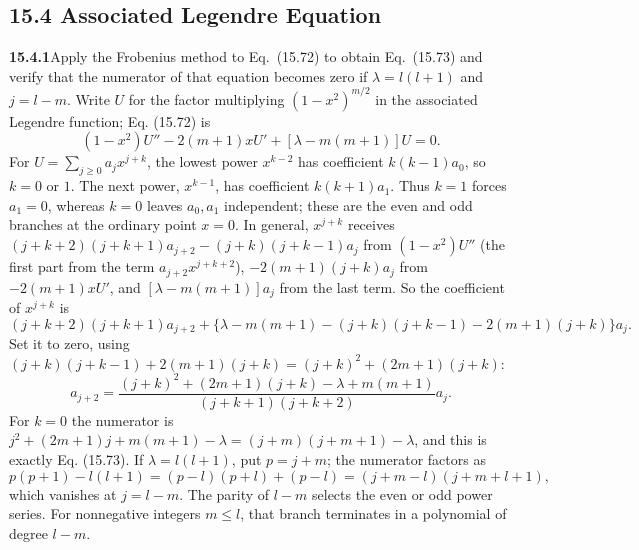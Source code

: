 \subsection*{15.4 Associated Legendre Equation}

\par\bigskip
\noindent\textbf{15.4.1}\quad Apply the Frobenius method to
Eq.~(15.72) to obtain Eq.~(15.73) and verify that the numerator of
that equation becomes zero if $\lambda=l(l+1)$ and $j=l-m$.
\solution
Write $U$ for the factor multiplying $(1-x^2)^{m/2}$ in the associated
Legendre function; Eq. (15.72) is
\[
(1-x^2)U''-2(m+1)xU'+[\lambda-m(m+1)]U=0.
\]
For $U=\sum_{j\ge0}a_jx^{j+k}$, the lowest power $x^{k-2}$
has coefficient $k(k-1)a_0$, so $k=0$ or $1$.
The next power, $x^{k-1}$, has coefficient $k(k+1)a_1$.
Thus $k=1$ forces $a_1=0$, whereas $k=0$ leaves $a_0,a_1$
independent; these are the even and odd branches at the ordinary
point $x=0$.
In general, $x^{j+k}$ receives
$(j+k+2)(j+k+1)a_{j+2}-(j+k)(j+k-1)a_j$ from $(1-x^2)U''$ (the first
part from the term $a_{j+2}x^{j+k+2}$), $-2(m+1)(j+k)a_j$ from
$-2(m+1)xU'$, and $[\lambda-m(m+1)]a_j$ from the last term. So the
coefficient of $x^{j+k}$ is
\[
(j+k+2)(j+k+1)a_{j+2}
+\{\lambda-m(m+1)-(j+k)(j+k-1)-2(m+1)(j+k)\}a_j.
\]
Set it to zero, using
$(j+k)(j+k-1)+2(m+1)(j+k)=(j+k)^2+(2m+1)(j+k)$:
\[
a_{j+2}=
\frac{(j+k)^2+(2m+1)(j+k)-\lambda+m(m+1)}
{(j+k+1)(j+k+2)}a_j.
\]
For $k=0$ the numerator is $j^2+(2m+1)j+m(m+1)-\lambda
=(j+m)(j+m+1)-\lambda$, and this is exactly Eq. (15.73).
If $\lambda=l(l+1)$, put $p=j+m$; the numerator factors as
\[
p(p+1)-l(l+1)=(p-l)(p+l)+(p-l)=(j+m-l)(j+m+l+1),
\]
which vanishes at $j=l-m$. The parity of $l-m$ selects the even
or odd power series. For nonnegative integers $m\le l$, that branch
terminates in a polynomial of degree $l-m$.

